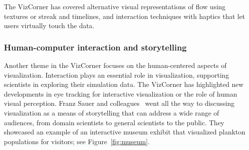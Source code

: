 \documentclass[10pt,journal,compsoc]{IEEEtran}
\begin{document}
The VizCorner has covered alternative visual representations of flow using textures or streak and timelines, 
and interaction techniques with haptics that let users virtually touch the data.

\subsubsection*{Human-computer interaction and storytelling}


Another theme in the VizCorner focuses on the human-centered aspects of visualization. Interaction plays an essential role in visualization, supporting scientists in exploring their simulation data. The VizCorner has highlighted new developments in eye tracking for interactive visualization or the role of human visual perception. Franz Sauer and colleagues~\cite{Sauer2016} went all the way to discussing visualization as a means of storytelling that can address a wide range of audiences, from domain scientists to general scientists to the public. They showcased an example of an interactive museum exhibit that visualized plankton populations for visitors; see Figure~\ref{fig:museum}.
\end{document}
